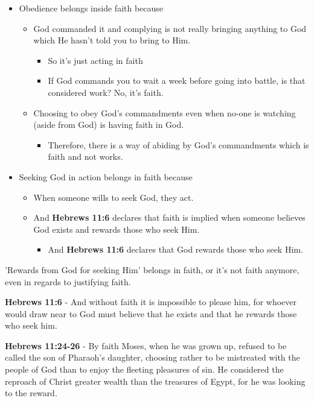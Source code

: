\documentclass[11pt]{article}
\begin{document}
\begin{itemize}
\item Obedience belongs inside faith because
\begin{itemize}
\item God commanded it and complying is not really bringing anything
to God which He hasn't told you to bring to Him.
\begin{itemize}
\item So it's just acting in faith
\item If God commands you to wait a week before going into battle, is that considered work? No, it's faith.
\end{itemize}
\item Choosing to obey God's commandments even when no-one is watching (aside from God) is having faith in God.
\begin{itemize}
\item Therefore, there is a way of abiding by God's commandments which is faith and not works.
\end{itemize}
\end{itemize}
\item Seeking God in action belongs in faith because
\begin{itemize}
\item When someone wills to seek God, they act.
\item And \textbf{Hebrews 11:6} declares that faith is implied when someone believes God exists and rewards those who seek Him.
\begin{itemize}
\item And \textbf{Hebrews 11:6} declares that God rewards those who seek Him.
\end{itemize}
\end{itemize}
\end{itemize}

'Rewards from God for seeking Him' belongs in faith, or it's not faith anymore, even in regards to justifying faith.

\textbf{Hebrews 11:6} - And without faith it is impossible to please him, for whoever would draw near to God must believe that he exists and that he rewards those who seek him.

\textbf{Hebrews 11:24-26} - By faith Moses, when he was grown up, refused to be called the son of Pharaoh's daughter, choosing rather to be mistreated with the people of God than to enjoy the fleeting pleasures of sin.  He considered the reproach of Christ greater wealth than the treasures of Egypt, for he was looking to the reward.
\end{document}
